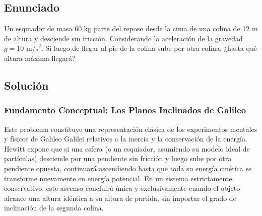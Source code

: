 \documentclass[12pt,a4paper]{article}
\begin{document}
\newpage
\subsection*{Enunciado}
Un esquiador de masa 60 kg parte del reposo desde la cima de una colina de 12 m de altura y desciende sin fricción. Considerando la aceleración de la gravedad $g = 10 \text{ m/s}^2$. Si luego de llegar al pie de la colina sube por otra colina, ¿hasta qué altura máxima llegará?

\begin{center}
\end{center}

\subsection*{Solución}

\subsubsection*{Fundamento Conceptual: Los Planos Inclinados de Galileo}
Este problema constituye una representación clásica de los experimentos mentales y físicos de Galileo Galilei relativos a la inercia y la conservación de la energía. Hewitt expone que si una esfera (o un esquiador, asumiendo su modelo ideal de partículas) desciende por una pendiente sin fricción y luego sube por otra pendiente opuesta, continuará ascendiendo hasta que toda su energía cinética se transforme nuevamente en energía potencial. En un sistema estrictamente conservativo, este ascenso concluirá única y exclusivamente cuando el objeto alcance una altura idéntica a su altura de partida, sin importar el grado de inclinación de la segunda colina.
\end{document}
